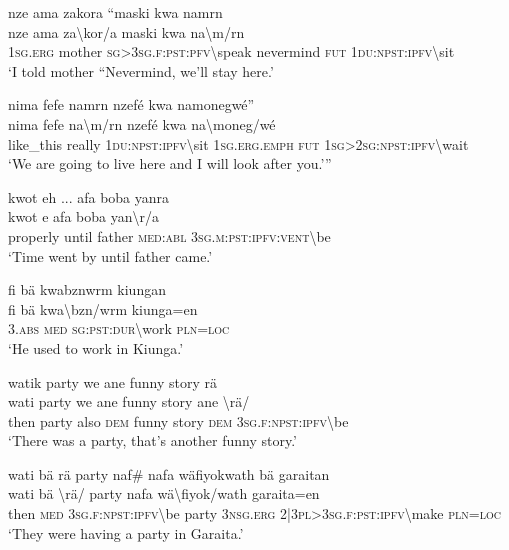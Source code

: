\newpage
\ea\label{ex:14:a3146}
nze ama zakora ``maski kwa namrn\\
\gll nze	ama	za{\textbackslash}kor/a	maski	kwa	na{\textbackslash}m/rn\\
     1\textsc{sg}.\textsc{erg}	mother	\textsc{sg}>3\textsc{sg}.\textsc{f}:\textsc{pst}:\textsc{pfv}{\textbackslash}speak	nevermind	\textsc{fut}	1\textsc{du}:\textsc{npst}:\textsc{ipfv}{\textbackslash}sit\\
\glt `I told mother ``Nevermind, we'll stay here.'
\z

\ea\label{ex:14:a3148}
nima fefe namrn nzefé kwa namonegwé''\\
\gll nima	fefe	na{\textbackslash}m/rn	nzefé	kwa	na{\textbackslash}moneg/wé\\
     like\_this	really	1\textsc{du}:\textsc{npst}:\textsc{ipfv}{\textbackslash}sit	1\textsc{sg}.\textsc{erg}.\textsc{emph}	\textsc{fut}	1\textsc{sg}>2\textsc{sg}:\textsc{npst}:\textsc{ipfv}{\textbackslash}wait\\
\glt `We are going to live here and I will look after you.'''
\z

\ea\label{ex:14:a3149}
kwot eh ... afa boba yanra\\
\gll kwot	e	afa	boba	yan{\textbackslash}r/a\\
     properly	until	father	\textsc{med}:\textsc{abl}	3\textsc{sg}.\textsc{m}:\textsc{pst}:\textsc{ipfv}:\textsc{vent}{\textbackslash}be\\
\glt `Time went by until father came.'
\z

\ea\label{ex:14:a3150}
fi bä kwabznwrm kiungan\\
\gll fi	bä	kwa{\textbackslash}bzn/wrm	kiunga=en\\
     3.\textsc{abs}	\textsc{med}	\textsc{sg}:\textsc{pst}:\textsc{dur}{\textbackslash}work	\textsc{pln}=\textsc{loc}\\
\glt `He used to work in Kiunga.'
\z

\ea\label{ex:14:a3153}
watik party we ane funny story rä\\
\gll wati	party	we	ane	funny	story	ane	{\textbackslash}rä/\\
     then	party	also	\textsc{dem}	funny	story	\textsc{dem}	3\textsc{sg}.\textsc{f}:\textsc{npst}:\textsc{ipfv}{\textbackslash}be\\
\glt `There was a party, that's another funny story.'
\z

\ea\label{ex:14:a3155}
wati bä rä party naf\# nafa wäfiyokwath bä garaitan\\
\gll wati	bä	{\textbackslash}rä/	party	nafa	wä{\textbackslash}fiyok/wath	garaita=en\\
     then	\textsc{med}	3\textsc{sg}.\textsc{f}:\textsc{npst}:\textsc{ipfv}{\textbackslash}be	party	3\textsc{nsg}.\textsc{erg}	2|3\textsc{pl}>3\textsc{sg}.\textsc{f}:\textsc{pst}:\textsc{ipfv}{\textbackslash}make	\textsc{pln}=\textsc{loc}\\
\glt `They were having a party in Garaita.'
\z

